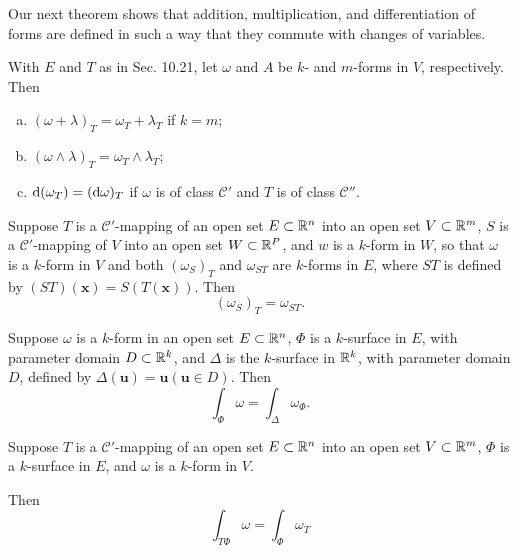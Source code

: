 Our next theorem shows that addition, multiplication, and differentiation
of forms are defined in such a way that they commute with changes of variables.

\begin{thm}
    \label{thm:10.22}
    With $E$ and $T$ as in Sec. 10.21, let $\omega$ and $A$ be $k$- and $m$-forms in $V$, respectively. Then
    \begin{enumerate}[(a)]
        \item $(\omega + \lambda)_T = \omega_T + \lambda_T$ if $k = m$;
        \item $(\omega \wedge \lambda)_T = \omega_T \wedge \lambda_T$;
        \item $\d (\omega_T) = (\d \omega)_T$ 
        if $\omega$ is of class $\mathscr{C}'$ 
        and $T$ is of class $\mathscr{C}''$.
    \end{enumerate}
\end{thm}


\begin{thm}
    \label{thm:10.23}
    Suppose $T$ is a $\mathscr{C}'$-mapping of an open set $E \subset {\protect\mathbb R}^n$ into an open set $V \subset {\protect\mathbb R}^m$, 
    $S$ is a $\mathscr{C}'$-mapping of $V$ into an open set $W \subset {\protect\mathbb R}^P$, and $w$ is a $k$-form in $W$, 
    so that $\omega$ is a $k$-form in $V$ 
    and both $(\omega_S)_T$ and $\omega_{ST}$ are $k$-forms in $E$, 
    where $ST$ is defined by $(ST)(\mathbf{x}) = S(T(\mathbf{x}))$. 
    Then
    \begin{equation}
        \label{eq:10.71}
        (\omega_S)_T = \omega_{ST} .        
    \end{equation}
\end{thm}


\begin{thm}
    \label{thm:10.24}
    Suppose $\omega$ is a $k$-form in an open set $E \subset {\protect\mathbb R}^n$, 
    $\Phi$ is a $k$-surface in $E$, with parameter domain $D \subset {\protect\mathbb R}^k$, 
    and $\Delta$ is the $k$-surface in ${\protect\mathbb R}^k$, with parameter domain $D$, defined by $\Delta(\mathbf{u}) = \mathbf{u}(\mathbf{u} \in D)$. Then
    \begin{equation*}
        \int_{\Phi} \omega = 
        \int_{\Delta} \omega_{\Phi} .
    \end{equation*}
\end{thm}


\begin{thm}
    \label{thm:10.25}
    Suppose $T$ is a $\mathscr{C}'$-mapping of an open set $E \subset {\protect\mathbb R}^n$ into an open set $V \subset {\protect\mathbb R}^m$, 
    $\Phi$ is a $k$-surface in $E$, 
    and $\omega$ is a $k$-form in $V$.

    Then 
    \begin{equation*}
        \int_{T \Phi} \omega = 
        \int_{\Phi} \omega_T
    \end{equation*}
\end{thm}

